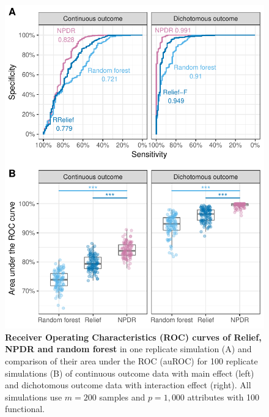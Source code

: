 \documentclass{article}
\begin{document}
\begin{figure}[h]%
\centerline{\includegraphics[]{../figs/roc_compare_100.pdf}}
\caption{\textbf{Receiver Operating Characteristics (ROC) curves of Relief, NPDR and random forest} in one replicate simulation (A) and comparison of their area under the ROC (auROC) for 100 replicate simulations (B) of continuous outcome data with main effect (left) and dichotomous outcome data with interaction effect (right). All simulations use $m = 200$ samples and $p = 1,000$ attributes with 100 functional.}
\label{fig:auROC}
\end{figure}
\end{document}
